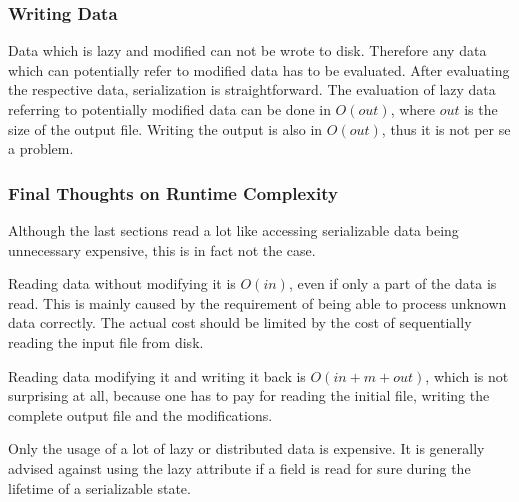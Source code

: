 \subsubsection{Writing Data}

Data which is lazy and modified can not be wrote to disk. Therefore any data which can potentially refer to modified data has to be evaluated. After evaluating the respective data, serialization is straightforward. The evaluation of lazy data referring to potentially modified data can be done in $O(out)$, where $out$ is the size of the output file. Writing the output is also in $O(out)$, thus it is not per se a problem.


\subsubsection{Final Thoughts on Runtime Complexity}

Although the last sections read a lot like accessing serializable data being unnecessary expensive, this is in fact not the case.

Reading data without modifying it is $O(in)$, even if only a part of the data is read. This is mainly caused by the requirement of being able to process unknown data correctly. The actual cost should be limited by the cost of sequentially reading the input file from disk.

Reading data modifying it and writing it back is $O(in + m + out)$, which is not surprising at all, because one has to pay for reading the initial file, writing the complete output file and the modifications.

Only the usage of a lot of lazy or distributed data is expensive. It is generally advised against using the lazy attribute if a field is read for sure during the lifetime of a serializable state.
